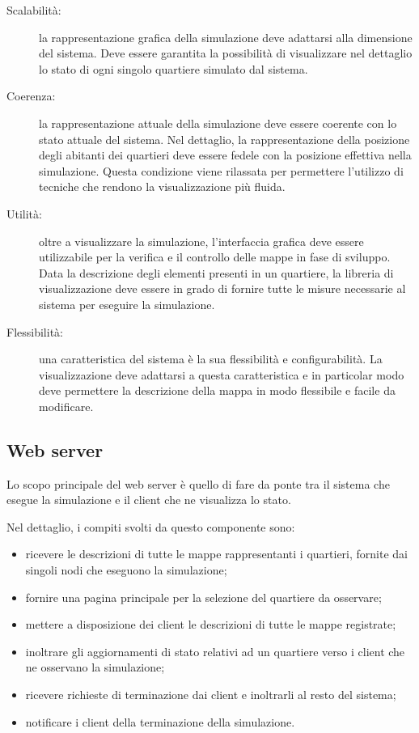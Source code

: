 \begin{description}
	\item[Scalabilità:] la rappresentazione grafica della simulazione deve 
	adattarsi alla dimensione del sistema. Deve essere garantita la possibilità 
	di visualizzare nel dettaglio lo stato di ogni singolo quartiere simulato dal
	sistema.

	\item[Coerenza:] la rappresentazione attuale della simulazione deve essere
	coerente con lo stato attuale del sistema. Nel dettaglio, la rappresentazione
	della posizione degli abitanti dei quartieri deve essere fedele con la
	posizione effettiva nella simulazione. Questa condizione viene rilassata per
	permettere l'utilizzo di tecniche che rendono la visualizzazione più fluida.
	
	\item[Utilità:] oltre a visualizzare la simulazione, l'interfaccia grafica deve
	essere utilizzabile per la verifica e il controllo delle mappe in fase di
	sviluppo. Data la descrizione degli elementi presenti in un quartiere, la
	libreria di visualizzazione deve essere in grado di fornire tutte le misure
	necessarie al sistema per eseguire la simulazione.
	
	\item[Flessibilità:] una caratteristica del sistema è la sua flessibilità e
	configurabilità. La visualizzazione deve adattarsi a questa caratteristica e in
	particolar modo deve permettere la descrizione della mappa in modo flessibile e
	facile da modificare.
	
\end{description}

\subsection{Web server}
Lo scopo principale del web server è quello di fare da ponte tra il sistema che
esegue la simulazione e il client che ne visualizza lo stato.

Nel dettaglio, i compiti svolti da questo componente sono:
\begin{itemize}
	\item ricevere le descrizioni di tutte le mappe rappresentanti i quartieri,
	fornite dai singoli nodi che eseguono la simulazione;
	\item fornire una pagina principale per la selezione del quartiere da
	osservare;
	\item mettere a disposizione dei client le descrizioni di tutte le mappe
	registrate;
	\item inoltrare gli aggiornamenti di stato relativi ad un quartiere verso i
	client che ne osservano la simulazione;
	\item ricevere richieste di terminazione dai client e inoltrarli al resto del
	sistema;
	\item notificare i client della terminazione della simulazione.
\end{itemize}

